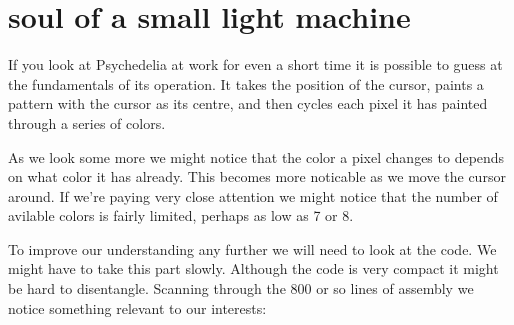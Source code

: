 \chapter{soul of a small light machine} 
\label{sec:listing_pattern}
\lstset{style=6502Style}

If you look at Psychedelia at work for even a short time it is possible to guess at the fundamentals
of its operation. It takes the position of the cursor, paints a pattern with the cursor as its centre,
and then cycles each pixel it has painted through a series of colors.

As we look some more we might notice that the color a pixel changes to depends on what color it has already.
This becomes more noticable as we move the cursor around. If we're paying very close attention we might notice
that the number of avilable colors is fairly limited, perhaps as low as 7 or 8.

To improve our understanding any further we will need to look at the code. We might have to take this part slowly.
Although the code is very compact it might be hard to disentangle. Scanning through the 800 or so lines of assembly
we notice something relevant to our interests:

